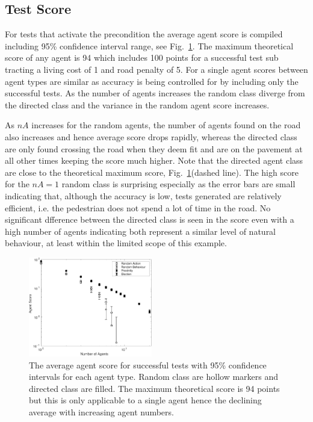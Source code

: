 \documentclass[letterpaper, 10 pt, journal, twoside]{IEEEtran}
\begin{document}
\subsection{Test Score}
For tests that activate the precondition the average agent score is compiled including 95\% confidence interval range, see Fig.~\ref{AgentScore}. The maximum theoretical score of any agent is 94 which includes 100 points for a successful test sub tracting a living cost of 1 and road penalty of 5. For a single agent scores between agent types are similar as accuracy is being controlled for by including only the successful tests. As the number of agents increases the random class diverge from the directed class and the variance in the random agent score increases. 

 As $nA$ increases for the random agents, the number of agents found on the road also increases and hence average score drops rapidly, whereas the directed class are only found crossing the road when they deem fit and are on the pavement at all other times keeping the score much higher.
%
 Note that the directed agent class are close to the theoretical maximum score, Fig.~\ref{AgentScore}(dashed line). 
%
The high score for the $nA=1$ random class is surprising especially as the error bars are small indicating that, although the accuracy is low, tests generated are relatively efficient, i.e. the pedestrian does not spend a lot of time in the road.
%
No significant dfference between the directed class is seen in the score even with a high number of agents indicating both represent a similar level of natural behaviour, at least within the limited scope of this example.


\begin{figure}[!t]
	\centering
\includegraphics[width=0.48\textwidth]{AgentScore.pdf}
	\caption{The average agent score for successful tests with 95\% confidence intervals for each agent type. Random class are hollow markers and directed class are filled. The maximum theoretical score is 94 points but this is only applicable to a single agent hence the declining average with increasing agent numbers.}
	\label{AgentScore}
\end{figure}
\end{document}
